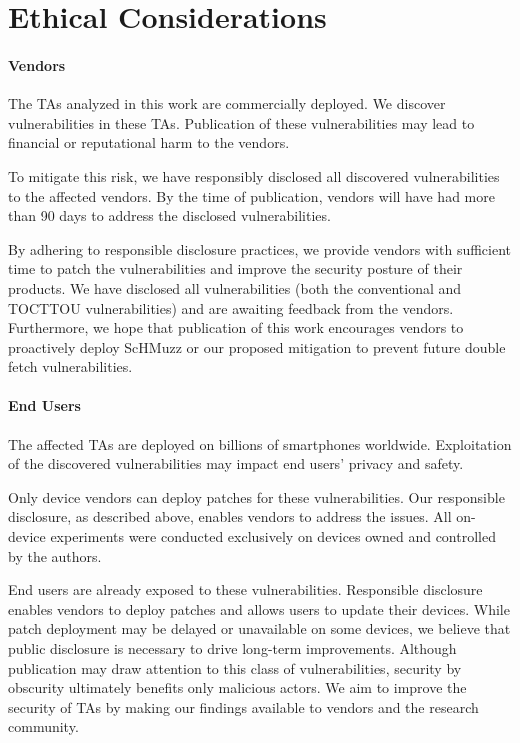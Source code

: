 \documentclass[letterpaper,twocolumn,10pt]{article}
\newcommand{\sysname}{ScHMuzz\xspace}
\begin{document}
\newpage

\appendix
\section*{Ethical Considerations}\label{sec:trash}

\paragraph{Vendors} The TAs analyzed in this work are commercially
deployed. We discover vulnerabilities in these TAs. Publication of these
vulnerabilities may lead to financial or reputational harm to the vendors.

To mitigate this risk, we have responsibly disclosed all
discovered vulnerabilities to the affected vendors. By the time of publication,
vendors will have had more than 90 days to address the disclosed vulnerabilities.

By adhering to responsible disclosure practices, we provide
vendors with sufficient time to patch the vulnerabilities and improve the
security posture of their products. We have disclosed all vulnerabilities (both 
the conventional and TOCTTOU vulnerabilities) 
and are awaiting feedback from the vendors. Furthermore, we hope
that publication of this work encourages vendors to proactively deploy \sysname
or our proposed mitigation to prevent future double fetch vulnerabilities.

\paragraph{End Users}
The affected TAs are deployed on billions of smartphones worldwide.
Exploitation of the discovered vulnerabilities may impact end users' privacy
and safety.

Only device vendors can deploy patches for these
vulnerabilities. Our responsible disclosure, as described above, enables vendors
to address the issues. All on-device experiments were conducted
exclusively on devices owned and controlled by the authors.

End users are already exposed to these vulnerabilities.
Responsible disclosure enables vendors to deploy patches and allows users to
update their devices. While patch deployment may be delayed or unavailable on
some devices, we believe that public disclosure is necessary to drive long-term
improvements. Although publication may draw attention to
this class of vulnerabilities, security by obscurity ultimately benefits only
malicious actors. We aim to improve the security of TAs by making our findings
available to vendors and the research community.
\end{document}
